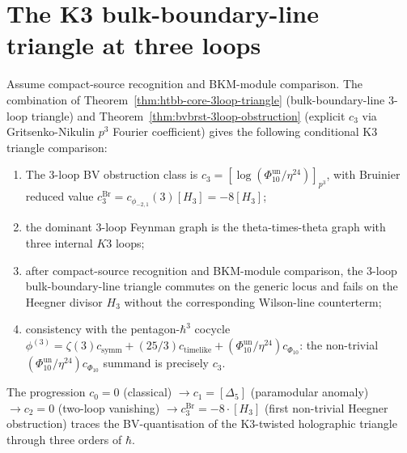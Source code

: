 \section{The K3 bulk-boundary-line triangle
at three loops}
\label{sec:htbb-core-supplement-ii}

\begin{remark}
\label{rem:htbb-core-synthesis}

Assume compact-source recognition and BKM-module comparison. The
combination of
Theorem~\ref{thm:htbb-core-3loop-triangle} (bulk-boundary-line
$3$-loop triangle) and
Theorem~\ref{thm:bvbrst-3loop-obstruction} (explicit $c_3$ via
Gritsenko-Nikulin $p^3$ Fourier coefficient) gives the following
conditional K3 triangle comparison:
\begin{enumerate}[leftmargin=1.8em]
\item The $3$-loop BV obstruction class is
 $c_3 = [\log(\Phi_{10}^{\mathrm{un}}/\eta^{24})]_{p^3}$, with
 Bruinier reduced value
 $c^{\mathrm{Br}}_3=c_{\phi_{-2,1}}(3)[H_3]=-8[H_3]$;
\item the dominant $3$-loop Feynman graph is the theta-times-theta
 graph with three internal $K3$ loops;
\item after compact-source recognition and BKM-module comparison, the
 $3$-loop bulk-boundary-line triangle commutes on the generic locus and
 fails on the Heegner divisor $H_3$ without the corresponding
 Wilson-line counterterm;
\item consistency with the pentagon-$\hbar^3$ cocycle
 $\phi^{(3)} = \zeta(3) c_{\mathrm{symm}} + (25/3) c_{\mathrm{timelike}}
 + (\Phi_{10}^{\mathrm{un}}/\eta^{24}) c_{\Phi_{10}}$: the non-trivial
 $(\Phi_{10}^{\mathrm{un}}/\eta^{24}) c_{\Phi_{10}}$ summand is precisely $c_3$.
\end{enumerate}
The progression $c_0 = 0$ (classical) $\to c_1 = [\Delta_5]$
(paramodular anomaly) $\to c_2 = 0$ (two-loop vanishing)
$\to c^{\mathrm{Br}}_3 = -8\cdot[H_3]$ (first non-trivial Heegner
obstruction) traces the
BV-quantisation of the K3-twisted holographic triangle through
three orders of $\hbar$.
\end{remark}

